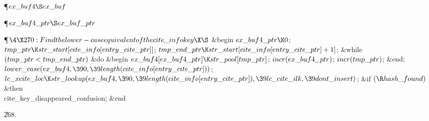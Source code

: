 \Y\P\D {}$\\{ex\_buf4}\S\\{ex\_buf}$\par
\P\D {}$\\{ex\_buf4\_ptr}\S\\{ex\_buf\_ptr}$\par
\Y\P$\4\X270:Find the lower-case equivalent of the \\{cite\_info} key\X\S$\6
\&{begin} $\\{ex\_buf4\_ptr}\K0$;\5
$\\{tmp\_ptr}\K\\{str\_start}[\\{cite\_info}[\\{entry\_cite\_ptr}]]$;\5
$\\{tmp\_end\_ptr}\K\\{str\_start}[\\{cite\_info}[\\{entry\_cite\_ptr}]+1]$;\6
\&{while} $(\\{tmp\_ptr}<\\{tmp\_end\_ptr})$ \1\&{do}\6
\&{begin} $\\{ex\_buf4}[\\{ex\_buf4\_ptr}]\K\\{str\_pool}[\\{tmp\_ptr}]$;\5
$\\{incr}(\\{ex\_buf4\_ptr})$;\5
$\\{incr}(\\{tmp\_ptr})$;\6
\&{end};\2\6
$\\{lower\_case}(\\{ex\_buf4},\390,\39\\{length}(\\{cite\_info}[\\{entry\_cite%
\_ptr}]))$;\6
$\\{lc\_xcite\_loc}\K\\{str\_lookup}(\\{ex\_buf4},\390,\39\\{length}(\\{cite%
\_info}[\\{entry\_cite\_ptr}]),\39\\{lc\_cite\_ilk},\39\\{dont\_insert})$;\6
\&{if} $(\R\\{hash\_found})$ \1\&{then}\5
\\{cite\_key\_disappeared\_confusion};\2\6
\&{end}\par
\U268.\fi

